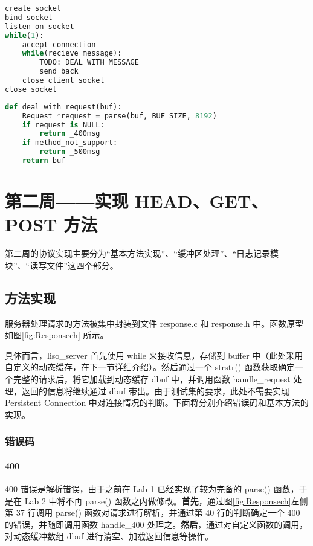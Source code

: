 \begin{lstlisting}[language=python, name={echo_server}]
create socket
bind socket
listen on socket
while(1):
    accept connection
    while(recieve message):
        TODO: DEAL WITH MESSAGE
        send back
    close client socket
close socket
\end{lstlisting}
    
\begin{lstlisting}[language=python, name={dealing with Data}]
def deal_with_request(buf):
    Request *request = parse(buf, BUF_SIZE, 8192)
    if request is NULL:
        return _400msg
    if method_not_support:
        return _500msg
    return buf
\end{lstlisting}

\section{第二周——实现 HEAD、GET、POST 方法}
第二周的协议实现主要分为“基本方法实现”、“缓冲区处理”、“日志记录模块”、“读写文件”这四个部分。

\subsection{方法实现}

服务器处理请求的方法被集中封装到文件 response.c 和 response.h 中。函数原型如图\ref{fig:Responsech} 所示。

具体而言，liso\_server 首先使用 while 来接收信息，存储到 buffer 中（此处采用自定义的动态缓存，在下一节详细介绍）。然后通过一个 strstr() 函数获取确定一个完整的请求后，将它加载到动态缓存 dbuf 中，并调用函数 handle\_request 处理，返回的信息将继续通过 dbuf 带出。由于测试集的要求，此处不需要实现 Persistent Connection 中对连接情况的判断。下面将分别介绍错误码和基本方法的实现。

\subsubsection{错误码}

\paragraph*{400}
400 错误是解析错误，由于之前在 Lab 1 已经实现了较为完备的 parse() 函数，于是在 Lab 2 中将不再 parse() 函数之内做修改。\textbf{首先}，通过图\ref{fig:Responsech}左侧 第 37 行调用 parse() 函数对请求进行解析，并通过第 40 行的判断确定一个 400 的错误，并随即调用函数 handle\_400 处理之。\textbf{然后}，通过对自定义函数的调用，对动态缓冲数组 dbuf 进行清空、加载返回信息等操作。

